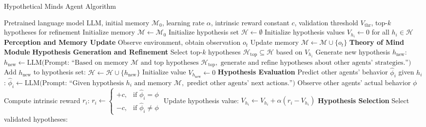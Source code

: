 \documentclass{article}
\begin{document}
\begin{algorithm}[t]
\caption{Hypothetical Minds Agent Algorithm}
\label{alg:HM}
\begin{algorithmic}[1]
\Require Pretrained language model $\text{LLM}$, initial memory $\mathcal{M}_0$, learning rate $\alpha$, intrinsic reward constant $c$, validation threshold $V_{\text{thr}}$, top-$k$ hypotheses for refinement
\State Initialize memory $\mathcal{M} \gets \mathcal{M}_0$
\State Initialize hypothesis set $\mathcal{H} \gets \emptyset$
\State Initialize hypothesis values $V_{h_i} \gets 0$ for all $h_i \in \mathcal{H}$
        \State \textbf{Perception and Memory Update}
        \State Observe environment, obtain observation $o_t$
        \State Update memory $\mathcal{M} \gets \mathcal{M} \cup \{o_t\}$
        \Statex
        \State \textbf{Theory of Mind Module}
        \State \textbf{Hypothesis Generation and Refinement}
            \State Select top-$k$ hypotheses $\mathcal{H}_{\text{top}} \subseteq \mathcal{H}$ based on $V_{h_i}$
            \State Generate new hypothesis $h_{\text{new}}$:
                \Statex \quad $h_{\text{new}} \gets \text{LLM}\big(\text{Prompt: ``Based on memory } \mathcal{M} \text{ and top hypotheses } \mathcal{H}_{\text{top}}, \text{ generate and refine hypotheses about other agents' strategies.''}\big)$
            \State Add $h_{\text{new}}$ to hypothesis set: $\mathcal{H} \gets \mathcal{H} \cup \{h_{\text{new}}\}$
            \State Initialize value $V_{h_{\text{new}}} \gets 0$
        \Statex
        \State \textbf{Hypothesis Evaluation}
            \State Predict other agents' behavior $\hat{\phi}_i$ given $h_i$:
                \Statex \quad $\hat{\phi}_i \gets \text{LLM}\big(\text{Prompt: ``Given hypothesis } h_i \text{ and memory } \mathcal{M}, \text{ predict other agents' next actions.''}\big)$
            \State Observe other agents' actual behavior $\phi$
            \State Compute intrinsic reward $r_i$:
                \Statex \quad $r_i \gets \begin{cases} 
                    +c, & \text{if } \hat{\phi}_i = \phi \\
                    -c, & \text{if } \hat{\phi}_i \neq \phi
                \end{cases}$
            \State Update hypothesis value:
                \Statex \quad $V_{h_i} \gets V_{h_i} + \alpha \left( r_i - V_{h_i} \right)$
        \EndFor
        \Statex
        \State \textbf{Hypothesis Selection}
        \State Select validated hypotheses:

\end{algorithmic}
\end{algorithm}
\end{document}
